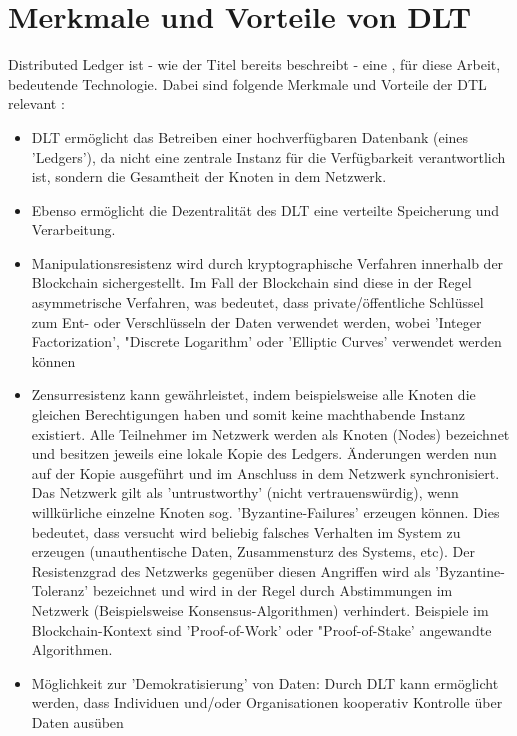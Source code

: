 \section{Merkmale und Vorteile von DLT}
Distributed Ledger ist - wie der Titel bereits beschreibt - eine , für diese Arbeit, bedeutende Technologie. Dabei sind folgende Merkmale und Vorteile der DTL relevant \cite{ID19}:
\begin{itemize}
	\item DLT ermöglicht das Betreiben einer hochverfügbaren Datenbank (eines 'Ledgers'), da nicht eine zentrale Instanz für die Verfügbarkeit verantwortlich ist, sondern die Gesamtheit der Knoten in dem Netzwerk.
	
	\item Ebenso ermöglicht die Dezentralität des DLT eine verteilte Speicherung und Verarbeitung.
	
	\item Manipulationsresistenz wird durch kryptographische Verfahren innerhalb der Blockchain sichergestellt. Im Fall  der Blockchain sind diese in der Regel asymmetrische Verfahren, was bedeutet, dass private/öffentliche Schlüssel zum Ent- oder Verschlüsseln der Daten verwendet werden, wobei 'Integer Factorization', "Discrete Logarithm' oder 'Elliptic Curves' verwendet werden können \cite{ID23}
	
	\item Zensurresistenz kann gewährleistet, indem beispielsweise alle Knoten die gleichen Berechtigungen haben und somit keine machthabende Instanz existiert. Alle Teilnehmer im Netzwerk werden als Knoten (Nodes) bezeichnet und besitzen jeweils eine lokale Kopie des Ledgers. Änderungen werden nun auf der Kopie ausgeführt und im Anschluss in dem Netzwerk synchronisiert. Das Netzwerk gilt als 'untrustworthy' (nicht vertrauenswürdig), wenn willkürliche einzelne Knoten sog. 'Byzantine-Failures' \cite{ID20} \cite{ID21} erzeugen können. Dies bedeutet, dass versucht wird beliebig falsches Verhalten im System zu erzeugen (unauthentische Daten, Zusammensturz des Systems, etc). Der Resistenzgrad des Netzwerks gegenüber diesen Angriffen wird als 'Byzantine-Toleranz' bezeichnet und wird in der Regel durch Abstimmungen im Netzwerk (Beispielsweise Konsensus-Algorithmen) verhindert. Beispiele im Blockchain-Kontext sind 'Proof-of-Work' oder "Proof-of-Stake' \cite{ID22} angewandte Algorithmen.
	
	\item Möglichkeit zur 'Demokratisierung' von Daten: Durch DLT kann ermöglicht werden, dass Individuen und/oder Organisationen kooperativ Kontrolle über Daten ausüben
	
\end{itemize}

